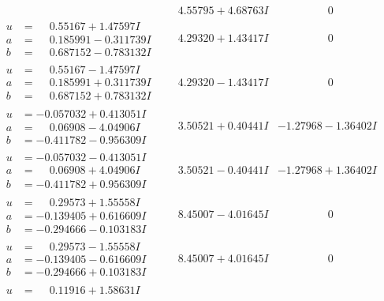 \documentclass[1p]{elsarticle_modified}
\theoremstyle{definition}
\begin{document}
$$\begin{array}{c|c|c}
 & \phantom{-}4.55795 + 4.68763 I & \phantom{-0.000000 } 0 \\ \hline\begin{aligned}
u &= \phantom{-}0.55167 + 1.47597 I \\
a &= \phantom{-}0.185991 - 0.311739 I \\
b &= \phantom{-}0.687152 - 0.783132 I\end{aligned}
 & \phantom{-}4.29320 + 1.43417 I & \phantom{-0.000000 } 0 \\ \hline\begin{aligned}
u &= \phantom{-}0.55167 - 1.47597 I \\
a &= \phantom{-}0.185991 + 0.311739 I \\
b &= \phantom{-}0.687152 + 0.783132 I\end{aligned}
 & \phantom{-}4.29320 - 1.43417 I & \phantom{-0.000000 } 0 \\ \hline\begin{aligned}
u &= -0.057032 + 0.413051 I \\
a &= \phantom{-}0.06908 - 4.04906 I \\
b &= -0.411782 - 0.956309 I\end{aligned}
 & \phantom{-}3.50521 + 0.40441 I & -1.27968 - 1.36402 I \\ \hline\begin{aligned}
u &= -0.057032 - 0.413051 I \\
a &= \phantom{-}0.06908 + 4.04906 I \\
b &= -0.411782 + 0.956309 I\end{aligned}
 & \phantom{-}3.50521 - 0.40441 I & -1.27968 + 1.36402 I \\ \hline\begin{aligned}
u &= \phantom{-}0.29573 + 1.55558 I \\
a &= -0.139405 + 0.616609 I \\
b &= -0.294666 - 0.103183 I\end{aligned}
 & \phantom{-}8.45007 - 4.01645 I & \phantom{-0.000000 } 0 \\ \hline\begin{aligned}
u &= \phantom{-}0.29573 - 1.55558 I \\
a &= -0.139405 - 0.616609 I \\
b &= -0.294666 + 0.103183 I\end{aligned}
 & \phantom{-}8.45007 + 4.01645 I & \phantom{-0.000000 } 0 \\ \hline\begin{aligned}
u &= \phantom{-}0.11916 + 1.58631 I \\

\end{aligned}
\end{array}$$
\end{document}
